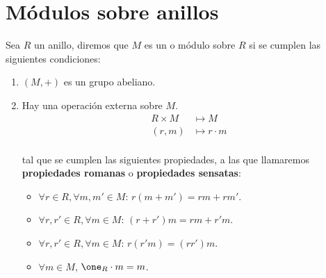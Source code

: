 \section{Módulos sobre anillos}
Sea $R$ un anillo, diremos que $M$ es un  o módulo sobre $R$ si se cumplen las siguientes condiciones:
\begin{enumerate}
	\item $(M,+)$ es un grupo abeliano.
	\item Hay una operación externa sobre $M$.
		\begin{align*}
			R×M & \longmapsto  M \\
			(r,m) & \longmapsto  r\cdot m \\
		\end{align*}

	tal que se cumplen las siguientes propiedades, a las que llamaremos \textbf{propiedades romanas} o \textbf{propiedades sensatas}:
	\begin{itemize}
		\item $\forall r \in R, \forall m,m' \in M$: $r(m+m')=rm+rm'$.
		\item $\forall r,r' \in R, \forall m \in M$: $(r+r')m=rm+r'm$.
		\item $\forall r,r' \in R, \forall m \in M$: $r(r'm)=(rr')m$.
		\item $\forall m \in M$, $\one_R\cdot m = m$.
	\end{itemize}
\end{enumerate}

